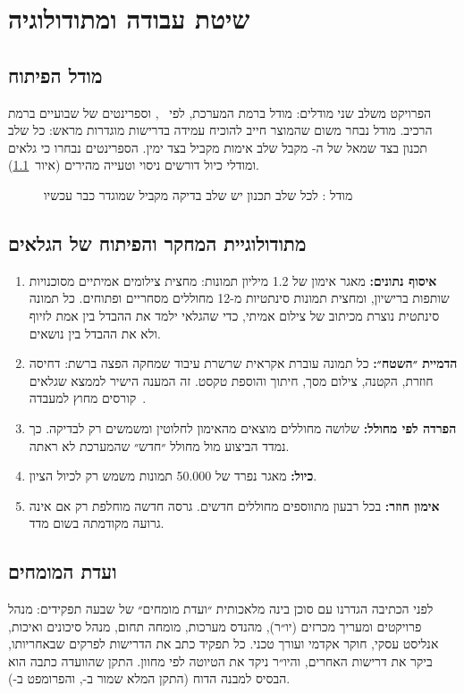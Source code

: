 \chapter{שיטת עבודה ומתודולוגיה}\label{ch:method}

\section{מודל הפיתוח}
הפרויקט משלב שני מודלים: מודל  ברמת המערכת, לפי ~\cite{iso15288}, וספרינטים של שבועיים ברמת הרכיב. מודל  נבחר משום שהמוצר חייב להוכיח עמידה בדרישות מוגדרות מראש: כל שלב תכנון בצד שמאל של ה- מקבל שלב אימות מקביל בצד ימין. הספרינטים נבחרו כי גלאים ומודלי כיול דורשים ניסוי וטעייה מהירים (איור~\ref{fig:vmodel}).

\begin{figure}[!htb]
\begin{ltrdiagram}

\end{ltrdiagram}
\caption{מודל : לכל שלב תכנון יש שלב בדיקה מקביל שמוגדר כבר עכשיו}\label{fig:vmodel}
\end{figure}

\section{מתודולוגיית המחקר והפיתוח של הגלאים}
\begin{enumerate}
\item \textbf{איסוף נתונים:} מאגר אימון של \num{1.2} מיליון תמונות: מחצית צילומים אמיתיים מסוכנויות שותפות ברישיון, ומחצית תמונות סינתטיות מ-\num{12} מחוללים מסחריים ופתוחים. כל תמונה סינתטית נוצרת מכיתוב של צילום אמיתי, כדי שהגלאי ילמד את ההבדל בין אמת לזיוף ולא את ההבדל בין נושאים.
\item \textbf{הדמיית ״השטח״:} כל תמונה עוברת אקראית שרשרת עיבוד שמחקה הפצה ברשת: דחיסה חוזרת, הקטנה, צילום מסך, חיתוך והוספת טקסט. זה המענה הישיר לממצא שגלאים קורסים מחוץ למעבדה~\cite{ren2025}.
\item \textbf{הפרדה לפי מחולל:} שלושה מחוללים מוצאים מהאימון לחלוטין ומשמשים רק לבדיקה. כך נמדד הביצוע מול מחולל ״חדש״ שהמערכת לא ראתה.
\item \textbf{כיול:} מאגר נפרד של \num{50,000} תמונות משמש רק לכיול הציון.
\item \textbf{אימון חוזר:} בכל רבעון מתווספים מחוללים חדשים. גרסה חדשה מוחלפת רק אם אינה גרועה מקודמתה בשום מדד.
\end{enumerate}

\section{ועדת המומחים}\label{sec:committee}
לפני הכתיבה הגדרנו עם סוכן בינה מלאכותית ״ועדת מומחים״ של שבעה תפקידים: מנהל פרויקטים ומעריך מכרזים (יו״ר), מהנדס מערכות, מומחה תחום, מנהל סיכונים ואיכות, אנליסט עסקי, חוקר אקדמי ועורך טכני. כל תפקיד כתב את הדרישות לפרקים שבאחריותו, ביקר את דרישות האחרים, והיו״ר ניקד את הטיוטה לפי מחוון. התקן שהוועדה כתבה הוא הבסיס למבנה הדוח (התקן המלא שמור ב-, והפרומפט ב-).

